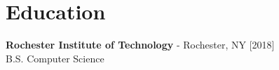 \documentclass[showluaboxes=false]{resume}
\begin{document}
		\section{Education}%
		\textbf{Rochester Institute of Technology}
		- {\small Rochester, NY}
		\hfill{}
		\\
		\begingroup
		\setlength{\parindent}{0.4in}
		\indent B.S. Computer Science
		\endgroup
		\vspace*{0.25\baselineskip}%
	
\end{document}
